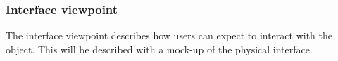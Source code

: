 
            
            
        
        
    \subsubsection{Interface viewpoint}
        The interface viewpoint describes how users can expect to interact with the object.
        This will be described with a mock-up of the physical interface.

        
        
        
            

            
            

